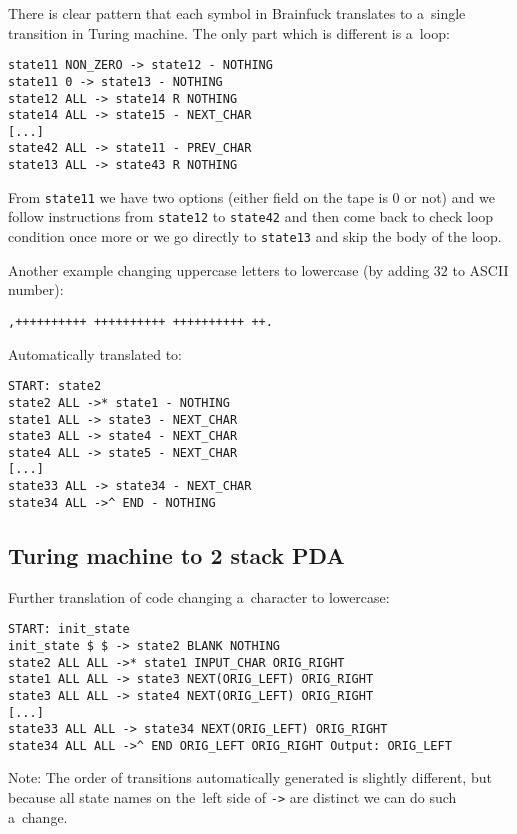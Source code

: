 \documentclass[english,shortabstract,mgr]{iithesis}
\begin{document}
\onecolumn
There is clear pattern that each symbol in Brainfuck translates
to a~single transition in Turing machine. The only part which is different
is a~loop:
\begin{verbatim}
state11 NON_ZERO -> state12 - NOTHING
state11 0 -> state13 - NOTHING
state12 ALL -> state14 R NOTHING
state14 ALL -> state15 - NEXT_CHAR
[...]
state42 ALL -> state11 - PREV_CHAR
state13 ALL -> state43 R NOTHING
\end{verbatim}

From \texttt{state11} we have two options (either field on the tape is $0$
or not) and we follow instructions from \texttt{state12} to \texttt{state42}
and then come back to check loop condition once more or we go directly
to \texttt{state13} and skip the body of the loop.

Another example changing uppercase letters to lowercase (by adding $32$
to ASCII number):

\begin{verbatim}
,++++++++++ ++++++++++ ++++++++++ ++.
\end{verbatim}

Automatically translated to:

\begin{verbatim}
START: state2
state2 ALL ->* state1 - NOTHING
state1 ALL -> state3 - NEXT_CHAR
state3 ALL -> state4 - NEXT_CHAR
state4 ALL -> state5 - NEXT_CHAR
[...]
state33 ALL -> state34 - NEXT_CHAR
state34 ALL ->^ END - NOTHING
\end{verbatim}

\subsection{Turing machine to 2 stack PDA}

Further translation of code changing a~character to lowercase:

\begin{verbatim}
START: init_state
init_state $ $ -> state2 BLANK NOTHING
state2 ALL ALL ->* state1 INPUT_CHAR ORIG_RIGHT
state1 ALL ALL -> state3 NEXT(ORIG_LEFT) ORIG_RIGHT
state3 ALL ALL -> state4 NEXT(ORIG_LEFT) ORIG_RIGHT
[...]
state33 ALL ALL -> state34 NEXT(ORIG_LEFT) ORIG_RIGHT
state34 ALL ALL ->^ END ORIG_LEFT ORIG_RIGHT Output: ORIG_LEFT
\end{verbatim}

Note: The order of transitions automatically generated is slightly different,
but because all state names on the~left side of \texttt{->} are distinct
we can do such a~change.
\end{document}
